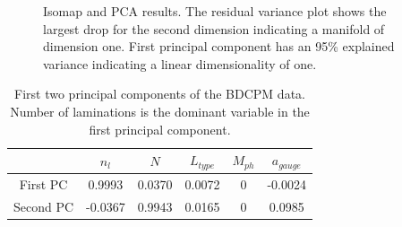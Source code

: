 \begin{figure}[ht]\begin{center}
    \caption{Isomap and PCA results. The residual variance plot shows the
      largest drop for the second dimension indicating a manifold of
      dimension one. First principal component has an 95\% explained
      variance indicating a linear dimensionality of one.}
    \label{bdcpmmVar}
  \end{center}
\end{figure}

\begin{table}[!ht]
  \centering
  \begin{tabular}{c|c|c|c|c|c|}
    \cline{2-6}
    & $n_l$ & $N$ & $ L_{type} $  & $ M_{ph}$ & $a_{gauge}$ \\
    \hline
    \multicolumn{1}{|c|}{First PC} & 0.9993 & 0.0370 & 0.0072 & 0 & -0.0024\\
    \hline
    \multicolumn{1}{|c|}{Second PC} & -0.0367 & 0.9943 & 0.0165 & 0 & 0.0985\\
    \hline
  \end{tabular}
  \caption{First two principal components of the BDCPM data. Number of laminations is the dominant variable in the first principal component.}
  \label{first2BDPCs}
\end{table}


